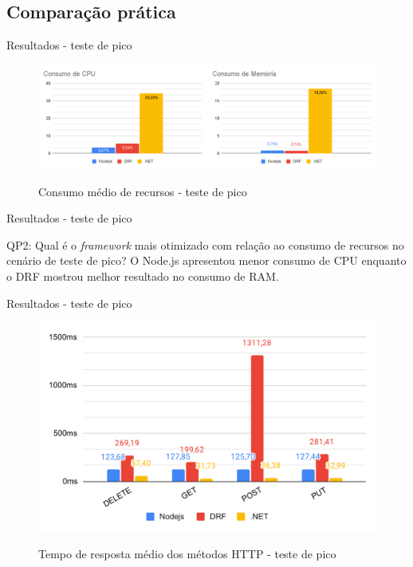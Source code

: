 \documentclass{libs/ufc_format}
\begin{document}
\subsection{Comparação prática}
\begin{frame}{Resultados - teste de pico}
    \begin{figure}[H]
        \centering
        \caption{Consumo médio de recursos - teste de pico}
        \includegraphics[width=1\linewidth]{figuras/resultados/consumo-recursos-pico.pdf}
        \captionsetup{justification=centering}
        \label{fig:recursos-pico}
    \end{figure}
\end{frame}

\begin{frame}{Resultados - teste de pico}
    \begin{block}{QP2: Qual é o \textit{framework} mais otimizado com relação ao consumo de recursos no cenário de teste de pico?}
        O Node.js apresentou menor consumo de CPU enquanto o DRF mostrou melhor resultado no consumo de RAM.
    \end{block}
\end{frame}

\begin{frame}{Resultados - teste de pico}
    \begin{figure}[H]
        \centering
        \caption{Tempo de resposta médio dos métodos HTTP - teste de pico}
        \includegraphics[width=0.9\linewidth]{figuras/resultados/spike1-tempo-metodos-totais3.pdf}
        \captionsetup{justification=centering}
        \label{fig:spike1-tempo-metodos-totais}
    \end{figure}
\end{frame}
\end{document}
